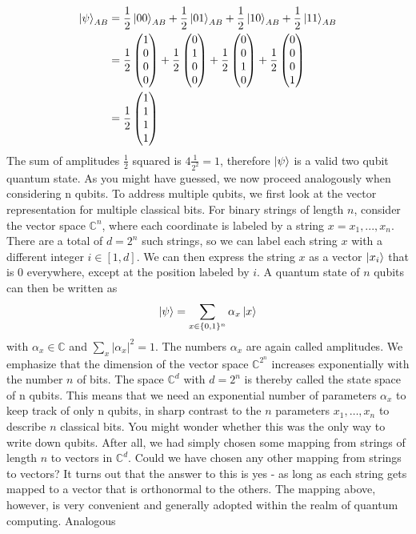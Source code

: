 \begin{align*}
\ket{\psi}_{AB}&=\frac{1}{2}\ket{00}_{AB}+\frac{1}{2}\ket{01}_{AB}+\frac{1}{2}\ket{10}_{AB}+\frac{1}{2}\ket{11}_{AB}\\
&=\frac{1}{2}\begin{pmatrix} 1 \\ 0 \\ 0 \\ 0 \end{pmatrix}+\frac{1}{2}\begin{pmatrix} 0 \\ 1 \\ 0 \\ 0 \end{pmatrix} + \frac{1}{2}\begin{pmatrix} 0 \\ 0 \\ 1 \\ 0 \end{pmatrix} + \frac{1}{2}\begin{pmatrix} 0 \\ 0 \\ 0 \\ 1 \end{pmatrix}\\
&=\frac{1}{2}\begin{pmatrix} 1 \\ 1 \\ 1 \\ 1 \end{pmatrix}
\end{align*}
The sum of amplitudes $\frac{1}{2}$ squared is $4\frac{1}{2^2}=1$, therefore $\ket{\psi}$ is a valid two qubit quantum state. As you might have guessed, we now proceed analogously when considering n qubits. To address
multiple qubits, we first look at the vector representation for multiple classical bits. For binary
strings of length $n$, consider the vector space $\mathbb{C}^n$, where each coordinate is labeled by a string
$x = x_1,..., x_n$. There are a total of $d = 2^n$ such strings, so we can label each string $x$ with a different
integer $i \in [1,d]$. We can then express the string $x$ as a vector $\ket{x_i}$ that is $0$ everywhere, except at the position labeled by $i$. A quantum state of $n$ qubits can then be written as
\[
\ket{\psi}=\sum_{x\in\{0,1\}^n} \alpha_x\ket{x}
\]
with $\alpha_x\in\mathbb{C}$ and $\sum_x |\alpha_x|^2=1$. The numbers $\alpha_x$ are again called amplitudes. We emphasize that the dimension of the vector space $\mathbb{C}^{2^n}$ increases exponentially with the number $n$ of bits. The space $\mathbb{C}^d$ with $d=2^n$ is thereby called the state space of n qubits. This means that we need an exponential number of parameters $\alpha_x$ to keep track of only n qubits, in sharp contrast to the $n$ parameters $x_1,\ldots , x_n$ to describe $n$ classical bits. You might wonder whether this was the only way to write down qubits. After all, we had simply chosen some mapping from strings of length $n$ to vectors in $\mathbb{C}^d$. Could we have chosen any other mapping from strings to vectors? It turns out that the answer to this is yes - as long as each string gets mapped to a vector that is orthonormal to the others. The mapping above, however, is very convenient and generally adopted within the realm of quantum computing. Analogous
